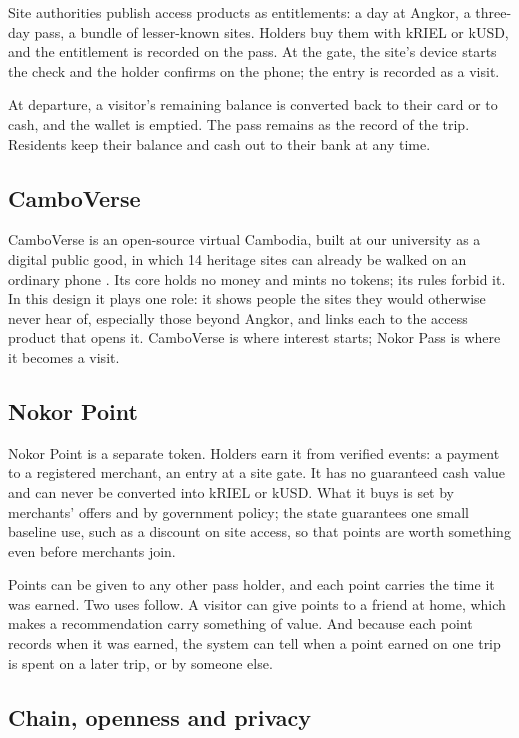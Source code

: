 \documentclass[10pt,letterpaper,twocolumn]{article}
\begin{document}
Site authorities publish access products as entitlements: a day at Angkor, a
three-day pass, a bundle of lesser-known sites. Holders buy them with kRIEL or
kUSD, and the entitlement is recorded on the pass. At the gate, the site's
device starts the check and the holder confirms on the phone; the entry is
recorded as a visit.

At departure, a visitor's remaining balance is converted back to their card or
to cash, and the wallet is emptied. The pass remains as the record of the trip.
Residents keep their balance and cash out to their bank at any time.

\subsection{CamboVerse}
\label{sec:camboverse}

CamboVerse is an open-source virtual Cambodia, built at our university as a
digital public good, in which 14 heritage sites can already be walked on an
ordinary phone \citep{chay2026precinct}. Its core holds no money and mints no
tokens; its rules forbid it. In this design it plays one role: it shows people
the sites they would otherwise never hear of, especially those beyond Angkor,
and links each to the access product that opens it. CamboVerse is where
interest starts; Nokor Pass is where it becomes a visit.

\subsection{Nokor Point}

Nokor Point is a separate token. Holders earn it from verified events: a
payment to a registered merchant, an entry at a site gate. It has no guaranteed
cash value and can never be converted into kRIEL or kUSD. What it buys is set
by merchants' offers and by government policy; the state guarantees one small
baseline use, such as a discount on site access, so that points are worth
something even before merchants join.

Points can be given to any other pass holder, and each point carries the time
it was earned. Two uses follow. A visitor can give points to a friend at home,
which makes a recommendation carry something of value. And because each point
records when it was earned, the system can tell when a point earned on one trip
is spent on a later trip, or by someone else.

\subsection{Chain, openness and privacy}
\end{document}
